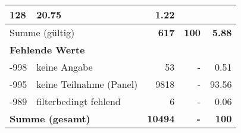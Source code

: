 \begin{longtable}{lXrrr}
       \num{128} &
       \num[round-mode=places,round-precision=2]{20,75} &
         \num[round-mode=places,round-precision=2]{1,22} \\
     \midrule
     \multicolumn{2}{l}{Summe (gültig)} &
       \textbf{\num{617}} &
     \textbf{100} &
       \textbf{\num[round-mode=places,round-precision=2]{5,88}} \\
     \multicolumn{5}{l}{\textbf{Fehlende Werte}}\\
       -998 &
       keine Angabe &
         \num{53} &
        - &
         \num[round-mode=places,round-precision=2]{0,51} \\
       -995 &
       keine Teilnahme (Panel) &
         \num{9818} &
        - &
         \num[round-mode=places,round-precision=2]{93,56} \\
       -989 &
       filterbedingt fehlend &
         \num{6} &
        - &
         \num[round-mode=places,round-precision=2]{0,06} \\
     \midrule
     \multicolumn{2}{l}{\textbf{Summe (gesamt)}} &
          \textbf{\num{10494}} &
        \textbf{-} &
        \textbf{100} \\
     \bottomrule
     \end{longtable}
     
